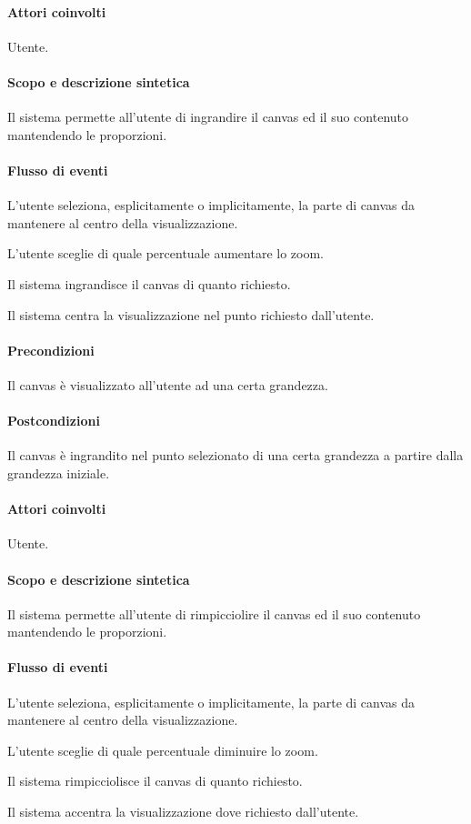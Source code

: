 \paragraph{Attori coinvolti} Utente.
\paragraph{Scopo e descrizione sintetica} 
Il sistema permette all'utente di ingrandire il canvas ed il suo contenuto mantendendo le proporzioni.
\paragraph{Flusso di eventi}
\begin{elenconumerato}[\textbf{}]{\subsubsecindent}
\item L'utente seleziona, esplicitamente o implicitamente, la parte di canvas da mantenere al centro della visualizzazione.
\item L'utente sceglie di quale percentuale aumentare lo zoom.
\item Il sistema ingrandisce il canvas di quanto richiesto.
\item Il sistema centra la visualizzazione nel punto richiesto dall'utente.
\end{elenconumerato}
\paragraph{Precondizioni} Il canvas \`e visualizzato all'utente ad una certa grandezza.
\paragraph{Postcondizioni} Il canvas \`e ingrandito nel punto selezionato di una certa grandezza a partire dalla grandezza iniziale.

\paragraph{Attori coinvolti} Utente.
\paragraph{Scopo e descrizione sintetica} 
Il sistema permette all'utente di rimpicciolire il canvas ed il suo contenuto mantendendo le proporzioni.
\paragraph{Flusso di eventi}
\begin{elenconumerato}[\textbf{}]{\subsubsecindent}
\item L'utente seleziona, esplicitamente o implicitamente, la parte di canvas da mantenere al centro della visualizzazione.
\item L'utente sceglie di quale percentuale diminuire lo zoom.
\item Il sistema rimpicciolisce il canvas di quanto richiesto.
\item Il sistema accentra la visualizzazione dove richiesto dall'utente.
\end{elenconumerato}
